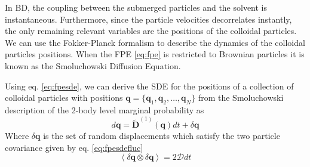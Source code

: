 \documentclass[ twoside,openright,titlepage,numbers=noenddot,%
headinclude,footinclude,cleardoublepage=empty,abstract=on,
BCOR=5mm,paper=a4,fontsize=11pt, dvipsnames
]{scrreprt}
\renewcommand{\vec}[1]{\bm{#1}}
\newcommand{\tens}[1]{\bm{\mathcal{#1}}}
\newcommand{\ppos}{q}
\begin{document}
In \gls{BD}, the coupling between the submerged particles and the solvent is instantaneous.
Furthermore, since the particle velocities decorrelates instantly, the only remaining relevant variables are the positions of the colloidal particles. We can use the Fokker-Planck formalism to describe the dynamics of the colloidal particles positions. When the \gls{FPE} \eqref{eq:fpe} is restricted to Brownian particles it is known as the Smoluchowski Diffusion Equation.

Using eq. \eqref{eq:fpesde}, we can derive the \gls{SDE} for the positions of a collection of colloidal particles with positions $\vec{q} =\{\vec{q}_1,\vec{q}_2,\dots, \vec{q}_N\}$ from the Smoluchowski description of the 2-body level marginal probability\cite{Dhont1996} as
\begin{equation}
  \label{eq:bdlange}
  d\vec{\ppos} = \widetilde{\vec{D}}^{(1)}(\vec{\ppos})dt + \delta\vec{\ppos}
\end{equation}
Where $\delta\vec{q}$ is the set of random displacements which satisfy the two particle covariance given by eq. \eqref{eq:fpesdefluc} 
\begin{equation}
  \label{eq:bdfluc}
  \left\langle \delta\vec{\ppos}\otimes \delta\vec{\ppos}\right\rangle = 2\tens{D} dt
\end{equation}
\end{document}
